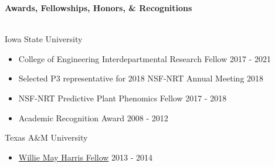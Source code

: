 \vspace{0.4cm}
{\Large \textbf{Awards, Fellowships, Honors, \& Recognitions}} \\[-0.4cm]
\makebox[\linewidth]{\rule{1.0\textwidth}{0.4pt}}\\
\vspace{0cm}

Iowa State University \\[-0.4cm]
\begin{itemize}[left=0.2cm, itemsep=0cm]
\vspace{0cm}
    \item College of Engineering Interdepartmental Research Fellow \hfill 2017 - 2021\\[-0.1cm]
    \item Selected P3 representative for 2018 NSF-NRT Annual Meeting \hfill 2018\\[-0.1cm]
    \item NSF-NRT Predictive Plant Phenomics Fellow \hfill 2017 - 2018\\[-0.1cm]
    \item Academic Recognition Award	\hfill 2008 - 2012\\[-0.1cm]
\end{itemize}

\vspace{-.2cm}
Texas A\&M University \\[-0.4cm]
\begin{itemize}[left=0.2cm, itemsep=0cm]
\vspace{0cm}
    \item \href{https://aglifesciences.tamu.edu/wp-content/uploads/2013/08/Willie-May-Harris-Graduate-Fellowship-criteria-190705.pdf}{{\color{black}Willie May Harris Fellow}} \hfill 2013 - 2014\\
    
\end{itemize}\vspace{-.5cm}


